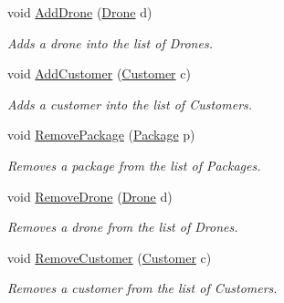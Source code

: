 \begin{DoxyCompactItemize}
void \hyperlink{classcsci3081_1_1Scheduler_a06957515a2861f5d8213f15466c231a9}{Add\+Drone} (\hyperlink{classcsci3081_1_1Drone}{Drone} d)
\begin{DoxyCompactList}\small\item\em Adds a drone into the list of Drones. \end{DoxyCompactList}\item 
\mbox{\label{classcsci3081_1_1Scheduler_a6b25bd5bbd478da964960c9175d90032}} 
void \hyperlink{classcsci3081_1_1Scheduler_a6b25bd5bbd478da964960c9175d90032}{Add\+Customer} (\hyperlink{classcsci3081_1_1Customer}{Customer} c)
\begin{DoxyCompactList}\small\item\em Adds a customer into the list of Customers. \end{DoxyCompactList}\item 
\mbox{\label{classcsci3081_1_1Scheduler_a5e1dd1d2bad1d9be7b82a5830efd376f}} 
void \hyperlink{classcsci3081_1_1Scheduler_a5e1dd1d2bad1d9be7b82a5830efd376f}{Remove\+Package} (\hyperlink{classcsci3081_1_1Package}{Package} p)
\begin{DoxyCompactList}\small\item\em Removes a package from the list of Packages. \end{DoxyCompactList}\item 
\mbox{\label{classcsci3081_1_1Scheduler_a0b13646a4c8758c4f6baf544a63c79e9}} 
void \hyperlink{classcsci3081_1_1Scheduler_a0b13646a4c8758c4f6baf544a63c79e9}{Remove\+Drone} (\hyperlink{classcsci3081_1_1Drone}{Drone} d)
\begin{DoxyCompactList}\small\item\em Removes a drone from the list of Drones. \end{DoxyCompactList}\item 
\mbox{\label{classcsci3081_1_1Scheduler_ae7d80f81e69926dbc365a8efafe6dc5d}} 
void \hyperlink{classcsci3081_1_1Scheduler_ae7d80f81e69926dbc365a8efafe6dc5d}{Remove\+Customer} (\hyperlink{classcsci3081_1_1Customer}{Customer} c)
\begin{DoxyCompactList}\small\item\em Removes a customer from the list of Customers. \end{DoxyCompactList}\end{DoxyCompactItemize}


